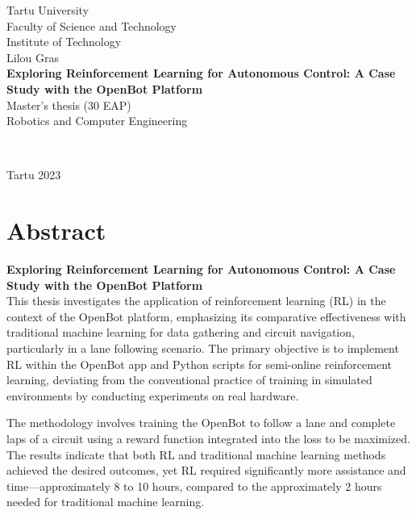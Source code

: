 \documentclass[12pt]{report}
\begin{document}
\thispagestyle{empty}
\begin{large}
\begin{center}
\vspace{20mm}
Tartu University
\\[5mm]
Faculty of Science and Technology
\\[5mm]
Institute of Technology
\\[5mm]
\vspace{50mm}
Lilou Gras
\\[10mm]
\textbf{Exploring Reinforcement Learning for Autonomous Control: A Case Study with the OpenBot Platform}
\\[10mm]
Master's thesis (30 EAP)\\
Robotics and Computer Engineering\\
\end{center}
\vspace{20mm}
\\[5mm]

\begin{center}
\vspace{65mm}
Tartu 2023\\
\end{center}
\end{large}
\newpage
\chapter*{Abstract}
\textbf{Exploring Reinforcement Learning for Autonomous Control: A Case Study with the OpenBot Platform}
\\[5mm]
This thesis investigates the application of reinforcement learning (RL) in the context of the OpenBot platform, emphasizing its comparative effectiveness with traditional machine learning for data gathering and circuit navigation, particularly in a lane following scenario. The primary objective is to implement RL within the OpenBot app and Python scripts for semi-online reinforcement learning, deviating from the conventional practice of training in simulated environments by conducting experiments on real hardware.

The methodology involves training the OpenBot to follow a lane and complete laps of a circuit using a reward function integrated into the loss to be maximized. The results indicate that both RL and traditional machine learning methods achieved the desired outcomes, yet RL required significantly more assistance and time—approximately 8 to 10 hours, compared to the approximately 2 hours needed for traditional machine learning.
\end{document}
